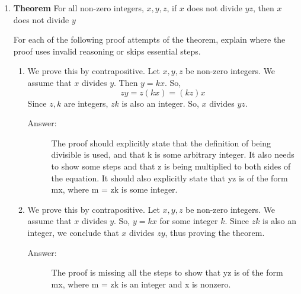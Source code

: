 \documentclass[12pt, oneside]{article}
\begin{document}
\begin{enumerate}
    


\item \textbf{Theorem} For all non-zero integers, $x, y, z$, if $x$ does not divide $yz$, then $x$ does not divide $y$ 

For each of the following proof attempts of the theorem, explain where the proof uses invalid reasoning or skips essential steps.
\quad
\begin{enumerate}
    \item We prove this by contrapositive. Let $x,y, z$ be non-zero integers. We assume that $x$ divides $y$. Then $y=kx$. So, \[zy= z(kx)=(kz)x\] Since $z, k$ are integers, $zk$ is also an integer. So, $x$ divides $yz$.
    
    \begin{description}
        \item[Answer:] The proof should explicitly state that the definition of being divisible is used, and that k is some arbitrary integer. It also needs to show some steps and that z is being multiplied to both sides of the equation. It should also explicitly state that yz is of the form mx, where m = zk is some integer.
    \end{description}

    \item We prove this by contrapositive. Let $x,y, z$ be non-zero integers. We assume that $x$ divides $y$. So, $y=kx$ for some integer $k$. Since $zk$ is also an integer, we conclude that $x$ divides $zy$, thus proving the theorem.
    
    \begin{description}
        \item[Answer:] The proof is missing all the steps to show that yz is of the form mx, where m = zk is an integer and x is nonzero.
    \end{description}


\end{enumerate}
\end{enumerate}
\end{document}
